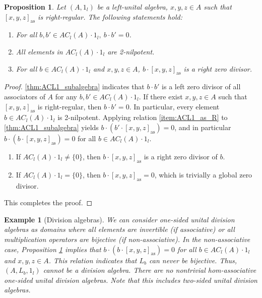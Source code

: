 \documentclass[12pt]{article}
\newtheorem{proposition}[theorem]{Proposition}
\newtheorem{example}[theorem]{Example}
\begin{document}
		\begin{proposition}\label{prop:ACl_2_nilpotent}
			Let $(A,1_l)$ be a left-unital algebra, $x,y,z\in A$ such that $[x,y,z]_{\mathrm{as}}$ is right-regular. The following statements hold:
			\begin{enumerate}[label=\textnormal{\arabic*)}]
				\item For all $b,b'\in AC_l(A)\cdot 1_l,\ b\cdot b'=0$.
				\item All elements in $AC_l(A)\cdot 1_l$ are 2-nilpotent.
				\item For all $b\in AC_l(A)\cdot 1_l$ and $x,y,z\in A$, $b\cdot [x,y,z]_{\mathrm{as}}$ is a right zero divisor.
			\end{enumerate}
		\end{proposition}
		\begin{proof}
			\cref{thm:ACL1_subalgebra} indicates that $b\cdot b'$ is a left zero divisor of all associators of $A$ for any $b,b'\in AC_l(A)\cdot 1_l$. If there exist $x,y,z\in A$ such that $[x,y,z]_{\mathrm{as}}$ is right-regular, then $b\cdot b'=0$. In particular, every element $b\in AC_l(A)\cdot 1_l$ is 2-nilpotent. Applying relation \ref{item:ACL1_as_R} to \cref{thm:ACL1_subalgebra} yields $b\cdot (b'\cdot [x,y,z]_{\mathrm{as}})=0$, and in particular $b\cdot (b\cdot [x,y,z]_{\mathrm{as}})=0$ for all $b\in AC_l(A)\cdot 1_l$.
			\begin{enumerate}[label=\textnormal{\arabic*)}]
				\item If $AC_l(A)\cdot 1_l\neq\{0\}$, then $b\cdot [x,y,z]_{\mathrm{as}}$ is a right zero divisor of $b$.
				\item If $AC_l(A)\cdot 1_l=\{0\}$, then $b\cdot [x,y,z]_{\mathrm{as}}=0$, which is trivially a global zero divisor.
			\end{enumerate}
			This completes the proof.
		\end{proof}
		
		\begin{example}[Division algebras]
			We can consider one-sided unital division algebras as domains where all elements are invertible (if associative) or all multiplication operators are bijective (if non-associative). In the non-associative case, Proposition \ref{prop:ACl_2_nilpotent} implies that $b\cdot (b\cdot [x,y,z]_{\mathrm{as}})=0$ for all $b\in AC_l(A)\cdot 1_l$ and $x,y,z\in A$. This relation indicates that $L_b$ can never be bijective. Thus,  $(A,L_b,1_l)$ cannot be a division algebra. There are no nontrivial hom-associative one-sided unital division algebras. Note that this includes two-sided unital division algebras.
		\end{example}
		
\end{document}
